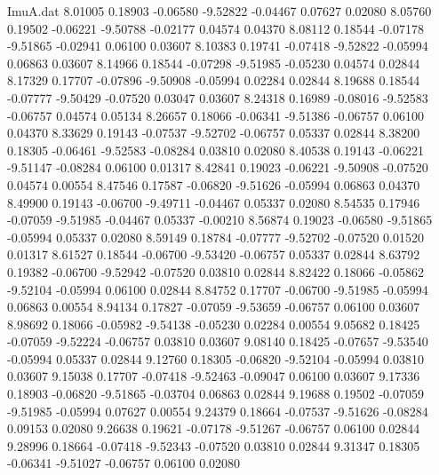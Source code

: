 \begin{filecontents}{ImuA.dat}
   8.01005    0.18903   -0.06580   -9.52822   -0.04467    0.07627    0.02080
   8.05760    0.19502   -0.06221   -9.50788   -0.02177    0.04574    0.04370
   8.08112    0.18544   -0.07178   -9.51865   -0.02941    0.06100    0.03607
   8.10383    0.19741   -0.07418   -9.52822   -0.05994    0.06863    0.03607
   8.14966    0.18544   -0.07298   -9.51985   -0.05230    0.04574    0.02844
   8.17329    0.17707   -0.07896   -9.50908   -0.05994    0.02284    0.02844
   8.19688    0.18544   -0.07777   -9.50429   -0.07520    0.03047    0.03607
   8.24318    0.16989   -0.08016   -9.52583   -0.06757    0.04574    0.05134
   8.26657    0.18066   -0.06341   -9.51386   -0.06757    0.06100    0.04370
   8.33629    0.19143   -0.07537   -9.52702   -0.06757    0.05337    0.02844
   8.38200    0.18305   -0.06461   -9.52583   -0.08284    0.03810    0.02080
   8.40538    0.19143   -0.06221   -9.51147   -0.08284    0.06100    0.01317
   8.42841    0.19023   -0.06221   -9.50908   -0.07520    0.04574    0.00554
   8.47546    0.17587   -0.06820   -9.51626   -0.05994    0.06863    0.04370
   8.49900    0.19143   -0.06700   -9.49711   -0.04467    0.05337    0.02080
   8.54535    0.17946   -0.07059   -9.51985   -0.04467    0.05337   -0.00210
   8.56874    0.19023   -0.06580   -9.51865   -0.05994    0.05337    0.02080
   8.59149    0.18784   -0.07777   -9.52702   -0.07520    0.01520    0.01317
   8.61527    0.18544   -0.06700   -9.53420   -0.06757    0.05337    0.02844
   8.63792    0.19382   -0.06700   -9.52942   -0.07520    0.03810    0.02844
   8.82422    0.18066   -0.05862   -9.52104   -0.05994    0.06100    0.02844
   8.84752    0.17707   -0.06700   -9.51985   -0.05994    0.06863    0.00554
   8.94134    0.17827   -0.07059   -9.53659   -0.06757    0.06100    0.03607
   8.98692    0.18066   -0.05982   -9.54138   -0.05230    0.02284    0.00554
   9.05682    0.18425   -0.07059   -9.52224   -0.06757    0.03810    0.03607
   9.08140    0.18425   -0.07657   -9.53540   -0.05994    0.05337    0.02844
   9.12760    0.18305   -0.06820   -9.52104   -0.05994    0.03810    0.03607
   9.15038    0.17707   -0.07418   -9.52463   -0.09047    0.06100    0.03607
   9.17336    0.18903   -0.06820   -9.51865   -0.03704    0.06863    0.02844
   9.19688    0.19502   -0.07059   -9.51985   -0.05994    0.07627    0.00554
   9.24379    0.18664   -0.07537   -9.51626   -0.08284    0.09153    0.02080
   9.26638    0.19621   -0.07178   -9.51267   -0.06757    0.06100    0.02844
   9.28996    0.18664   -0.07418   -9.52343   -0.07520    0.03810    0.02844
   9.31347    0.18305   -0.06341   -9.51027   -0.06757    0.06100    0.02080

\end{filecontents}
